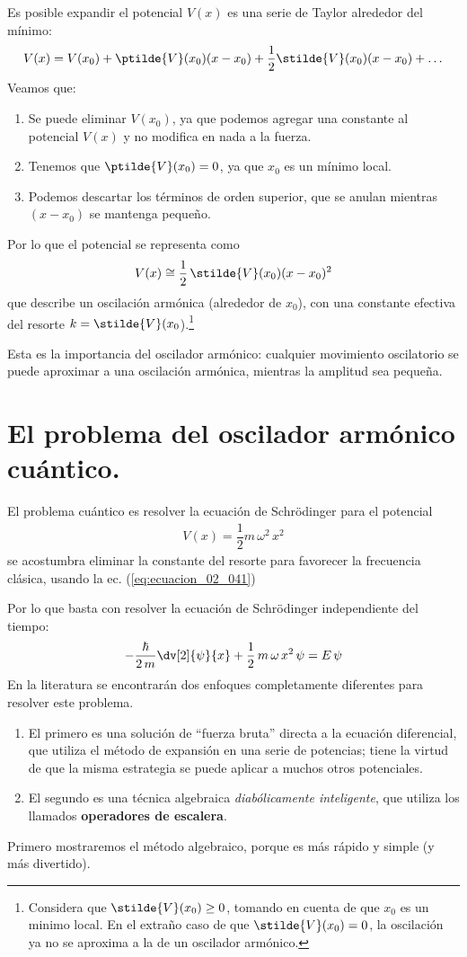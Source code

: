 Es posible expandir el potencial $V(x)$ es una serie de Taylor alrededor del mínimo:
\begin{align*}
V(x) = V(x_{0}) + \ptilde{V} (x_{0}) (x - x_{0}) + \dfrac{1}{2} \stilde{V} (x_{0}) (x - x_{0}) + \ldots
\end{align*}
Veamos que:
\begin{enumerate}
\item Se puede eliminar $V(x_{0})$, ya que podemos agregar una constante al potencial $V(x)$ y no modifica en nada a la fuerza.
\item Tenemos que $\ptilde{V}(x_{0}) = 0$, ya que $x_{0}$ es un mínimo local.
\item Podemos descartar los términos de orden superior, que se anulan mientras $(x - x_{0})$ se mantenga pequeño.
\end{enumerate}
Por lo que el potencial se representa como
\begin{align*}
V(x) \cong \dfrac{1}{2} \, \stilde{V} (x_{0}) (x - x_{0})^{2}
\end{align*}
que describe un oscilación armónica (alrededor de $x_{0}$), con una constante efectiva del resorte $k = \stilde{V} (x_{0}$).\footnote{Considera que $\stilde{V}(x_{0})\geq 0$, tomando en cuenta de que $x_{0}$ es un minimo local. En el extraño caso de que $\stilde{V} (x_{0})= 0$, la oscilación ya no se aproxima a la de un oscilador armónico.}
\par
Esta es la importancia del oscilador armónico: cualquier movimiento oscilatorio se puede aproximar a una oscilación armónica, mientras la amplitud sea pequeña.
\section{El problema del oscilador armónico cuántico.}
El problema cuántico es resolver la ecuación de Schrödinger para el potencial
\begin{align}
V(x) = \dfrac{1}{2} m \, \omega^{2} \, x^{2}
\label{eq:ecuacion_02_043}
\end{align}
se acostumbra eliminar la constante del resorte para favorecer la frecuencia clásica, usando la ec. (\ref{eq:ecuacion_02_041})
\par
Por lo que basta con resolver la ecuación de Schrödinger independiente del tiempo:
\begin{align}
- \dfrac{\hbar}{2 \, m} \dv[2]{\psi}{x} + \dfrac{1}{2} \, m \, \omega \, x^{2} \, \psi = E \, \psi
\label{eq:ecuacion_02_044}
\end{align}
En la literatura se encontrarán dos enfoques completamente diferentes para resolver este problema.
\begin{enumerate}
\item El primero es una solución de \enquote{fuerza bruta} directa a la ecuación diferencial, que utiliza el método de expansión en una serie de potencias; tiene la virtud de que la misma estrategia se puede aplicar a muchos otros potenciales.
\item El segundo es una técnica algebraica \emph{diabólicamente inteligente}, que utiliza los llamados \textbf{operadores de escalera}.
\end{enumerate}
Primero mostraremos el método algebraico, porque es más rápido y simple (y más divertido).
